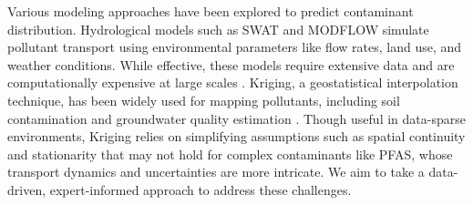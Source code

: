 Various modeling approaches have been explored to predict contaminant distribution. %
Hydrological models such as SWAT \cite{SWAT2023} and MODFLOW \cite{ktorcoletti_2012} simulate pollutant transport using environmental parameters like flow rates, land use, and weather conditions. While effective, these models require extensive data %
and are computationally expensive at large scales \cite{zhi2024deep}. %
%
Kriging, a geostatistical interpolation technique, has been widely used for mapping pollutants, including soil contamination \cite{Largueche_2006} and groundwater quality estimation \cite{Singh_Verma_2019}. Though useful in data-sparse environments, Kriging relies on simplifying assumptions such as spatial continuity and stationarity \cite{GISGeography_2017} that may not hold for complex contaminants like PFAS, whose transport dynamics and uncertainties are  more intricate. We aim to take a data-driven, expert-informed approach to address these challenges. %




